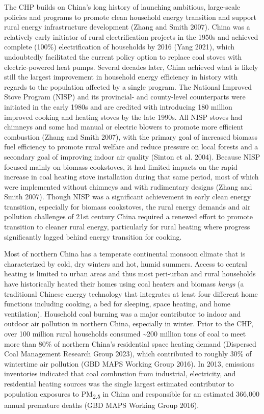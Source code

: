 \documentclass[
  letterpaper,
  DIV=11,
  numbers=noendperiod]{scrartcl}
\begin{document}
The CHP  builds on China's long history of launching
ambitious, large-scale policies and programs to promote clean household
energy transition and support rural energy infrastructure development
(Zhang and Smith 2007). China was a relatively early initiator of rural
electrification projects in the 1950s and achieved complete (100\%)
electrification of households by 2016 (Yang 2021), which undoubtedly
facilitated the current policy option to replace coal stoves with
electric-powered heat pumps. Several decades later, China achieved what
is likely still the largest improvement in household energy efficiency
in history with regards to the population affected by a single program.
The National Improved Stove Program (NISP) and its provincial- and
county-level counterparts were initiated in the early 1980s and are
credited with introducing 180 million improved cooking and heating
stoves by the late 1990s. All NISP stoves had chimneys and some had
manual or electric blowers to promote more efficient combustion (Zhang
and Smith 2007), with the primary goal of increased biomass fuel
efficiency to promote rural welfare and reduce pressure on local forests
and a secondary goal of improving indoor air quality (Sinton et al.
2004). Because NISP focused mainly on biomass cookstoves, it had limited
impacts on the rapid increase in coal heating stove installation during
that same period, most of which were implemented without chimneys and
with rudimentary designs (Zhang and Smith 2007). Though NISP was a
significant achievement in early clean energy transition, especially for
biomass cookstoves, the rural energy demands and air pollution
challenges of 21st century China required a renewed effort to promote
transition to cleaner rural energy, particularly for rural heating where
progress significantly lagged behind energy transition for cooking.

Most of northern China has a temperate continental monsoon climate that
is characterized by cold, dry winters and hot, humid summers. Access to
central heating is limited to urban areas and thus most peri-urban and
rural households have historically heated their homes using coal heaters
and biomass \emph{kangs} (a traditional Chinese energy technology that
integrates at least four different home functions including cooking, a
bed for sleeping, space heating, and home ventilation). Household coal
burning was a major contributor to indoor and outdoor air pollution in
northern China, especially in winter. Prior to the CHP, over 100 million
rural households consumed \textasciitilde200 million tons of coal to
meet more than 80\% of northern China's residential space heating demand
(Dispersed Coal Management Research Group 2023), which contributed to
roughly 30\% of wintertime air pollution (GBD MAPS Working Group 2016).
In 2013, emissions inventories indicated that coal combustion from
industrial, electricity, and residential heating sources was the single
largest estimated contributor to population exposures to
PM\textsubscript{2.5} in China and responsible for an estimated 366,000
annual premature deaths (GBD MAPS Working Group 2016).
\end{document}
